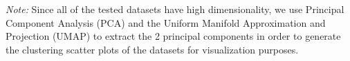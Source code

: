 \textit{Note:} Since all of the tested datasets have high dimensionality, we use Principal Component Analysis (PCA) and the Uniform Manifold Approximation and Projection (UMAP)
 to extract the 2 principal components in order to generate the clustering scatter plots of the datasets for visualization purposes.












